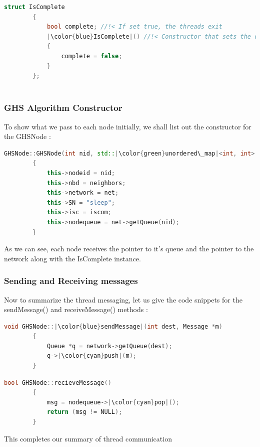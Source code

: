 \documentclass[letterpaper,11pt]{article}
\begin{document}
	\begin{lstlisting}[language=C++, caption= IsComplete]
		struct IsComplete
		{
			bool complete; //!< If set true, the threads exit
			|\color{blue}IsComplete|() //!< Constructor that sets the default value false
			{
				complete = false; 
			}
		};
		
	\end{lstlisting}
	
	\subsubsection{GHS Algorithm Constructor}
	
	To show what we pass to each node initially, we shall list out the constructor for the GHSNode : 
	
	\begin{lstlisting}[language=C++, caption= GHSNode constructor]
		GHSNode::GHSNode(int nid, std::|\color{green}unordered\_map|<int, int> &neighbors, Network *net, IsComplete *iscom)
		{
			this->nodeid = nid;
			this->nbd = neighbors;
			this->network = net;
			this->SN = "sleep";
			this->isc = iscom;
			this->nodequeue = net->getQueue(nid);
		}
	\end{lstlisting}

	As we can see, each node receives the pointer to it's queue and the pointer to the network along with the IsComplete instance.  \\
	
	\subsubsection{Sending and Receiving messages}
	
	Now to summarize the thread messaging, let us give the code snippets for the {\sc sendMessage}() and {\sc receiveMessage}() methods : 
	
	\begin{lstlisting}[language=C++, caption= sendMessage]
		void GHSNode::|\color{blue}sendMessage|(int dest, Message *m)
		{
			Queue *q = network->getQueue(dest);
			q->|\color{cyan}push|(m);
		}
	\end{lstlisting}
	
	\begin{lstlisting}[language=C++, caption= receiveMessage]
		bool GHSNode::recieveMessage()
		{
			msg = nodequeue->|\color{cyan}pop|();
			return (msg != NULL);
		}
	\end{lstlisting}

	This completes our summary of thread communication 
	
\end{document}
